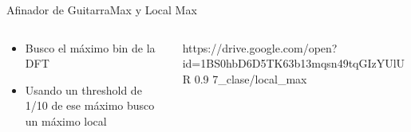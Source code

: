 \begin{frame}[t]{Afinador de Guitarra}{Max y Local Max}
   \footnotesize
   \begin{columns}
      \begin{column}{.5\textwidth}
         \begin{itemize}
            \item{Busco el máximo bin de la DFT}
            \item{Usando un threshold de 1/10 de ese máximo busco un máximo local}
         \end{itemize}
      
      \end{column}
      \begin{column}{.5\textwidth}
         {https://drive.google.com/open?id=1BS0hbD6D5TK63b13mqsn49tqGIzYUlUR}
         {0.9}
         {7_clase/local_max}
      \end{column}
   \end{columns}
   \vfill
   \note{
      \begin{itemize}
         \item{}
         \item{}
      \end{itemize}
   }
\end{frame}
